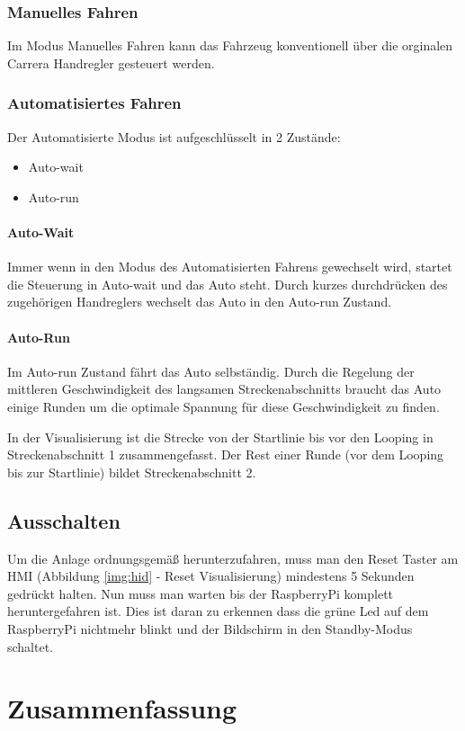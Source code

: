 \documentclass[a4paper, 11pt]{report}
\begin{document}
	\subsection{Manuelles Fahren}\label{subsec:ManuellesFahren}
		Im Modus Manuelles Fahren kann das Fahrzeug konventionell über die orginalen Carrera Handregler gesteuert
		werden.
	\subsection{Automatisiertes Fahren}
		Der Automatisierte Modus ist aufgeschlüsselt in 2 Zustände:
		\begin{itemize}
			\item Auto-wait
			\item Auto-run
		\end{itemize}
		\subsubsection{Auto-Wait}
		Immer wenn in den Modus des Automatisierten Fahrens gewechselt wird, startet die Steuerung in
		Auto-wait und das Auto steht.
		Durch kurzes durchdrücken des zugehörigen Handreglers wechselt das Auto in den Auto-run Zustand.
		\subsubsection{Auto-Run}
			Im Auto-run Zustand fährt das Auto selbständig. Durch die Regelung der mittleren Geschwindigkeit des langsamen Streckenabschnitts braucht das Auto einige Runden um die optimale Spannung für diese Geschwindigkeit zu finden.

			In der Visualisierung ist die Strecke von der Startlinie bis vor den Looping in Streckenabschnitt 1 zusammengefasst.
			Der Rest einer Runde (vor dem Looping bis zur Startlinie) bildet Streckenabschnitt 2.
\section{Ausschalten}
Um die Anlage ordnungsgemäß herunterzufahren, muss man den Reset Taster am HMI (Abbildung \ref{img:hid} - Reset Visualisierung) mindestens 5 Sekunden gedrückt halten.
Nun muss man warten bis der RaspberryPi komplett heruntergefahren ist. Dies ist daran zu erkennen dass die grüne Led auf dem RaspberryPi nichtmehr blinkt und der Bildschirm in den Standby-Modus schaltet.
\chapter{Zusammenfassung}
\end{document}
